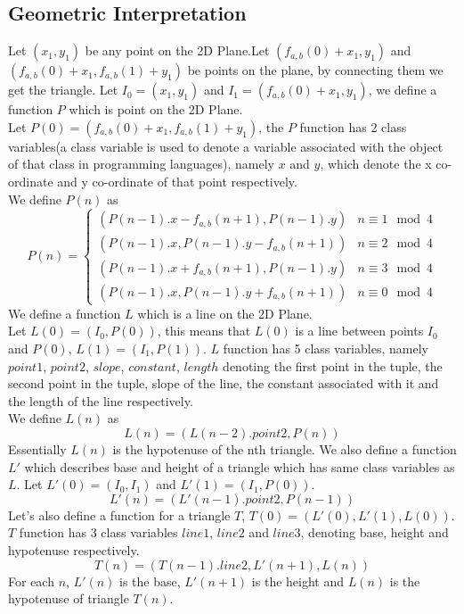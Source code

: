 \documentclass[preprint,12pt]{elsarticle}
\begin{document}
\subsection{Geometric Interpretation}
\label{geo}
Let $(x_1, y_1)$ be any point on the 2D Plane.Let $(f_{a,b}(0) + x_1, y_1)$ and $(f_{a,b}(0) + x_1, f_{a,b}(1) + y_1)$ be points on the plane, by connecting them we get the triangle.
Let $I_0 = (x_1, y_1)$ and $I_1 = (f_{a,b}(0) + x_1, y_1)$, we define a function $P$ which is point on the 2D Plane.\\
Let $P(0) = (f_{a,b}(0) + x_1, f_{a,b}(1) + y_1)$, the $P$ function has 2 class variables(a class variable is used to denote a variable associated with the object of that class in programming languages), namely $x$ and $y$, which denote the x co-ordinate and y co-ordinate of that point respectively.\\
We define $P(n)$ as
\begin{equation*}
P(n) = \begin{cases}
(P(n - 1).x - f_{a,b}(n + 1), P(n - 1).y) & n \equiv 1\mod 4\\
(P(n - 1).x, P(n - 1).y - f_{a,b}(n + 1)) & n \equiv 2\mod 4\\
(P(n - 1).x + f_{a,b}(n + 1), P(n - 1).y) & n \equiv 3\mod 4\\
(P(n - 1).x, P(n - 1).y + f_{a,b}(n + 1)) & n \equiv 0\mod 4
\end{cases}
\end{equation*}
We define a function $L$ which is a line on the 2D Plane.\\
Let $L(0) = (I_0, P(0))$, this means that $L(0)$ is a line between points $I_0$ and $P(0)$, $L(1) = (I_1, P(1))$. $L$ function has 5 class variables, namely $point1$, $point2$, $slope$, $constant$, $length$ denoting the first point in the tuple, the second point in the tuple, slope of the line, the constant associated with it and the length of the line respectively.\\
We define $L(n)$ as $$L(n) = (L(n - 2).point2, P(n))$$ 
Essentially $L(n)$ is the hypotenuse of the nth triangle.
We also define a function $L'$ which describes base and height of a triangle which has same class variables as $L$.
Let $L'(0) = (I_0, I_1)$ and $L'(1) = (I_1, P(0))$.
$$L'(n) = (L'(n - 1).point2, P(n - 1))$$
Let's also define a function for a triangle $T$, $T(0) = (L'(0), L'(1), L(0))$. $T$ function has 3 class variables $line1$, $line2$ and $line3$, denoting base, height and hypotenuse respectively.
$$T(n) = (T(n - 1).line2, L'(n + 1), L(n))$$
For each $n$, $L'(n)$ is the base, $L'(n + 1)$ is the height and $L(n)$ is the hypotenuse of triangle $T(n)$.\\
\end{document}
